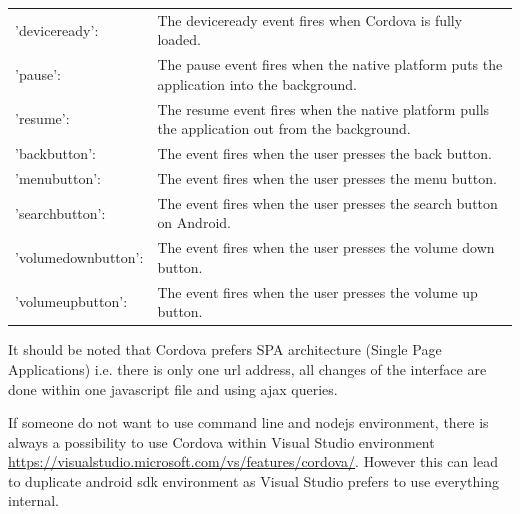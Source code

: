 \begin{tabularx}{\textwidth}{lX}
'deviceready':& The deviceready event fires when Cordova is fully loaded.\\
'pause': & The pause event fires when the native platform puts the application into the background.\\
'resume':& The resume event fires when the native platform pulls the application out from the background.\\
'backbutton':& The event fires when the user presses the back button.\\
'menubutton':& The event fires when the user presses the menu button. \\
'searchbutton':& The event fires when the user presses the search button on Android. \\
'volumedownbutton':& The event fires when the user presses the volume down button.\\
'volumeupbutton':& The event fires when the user presses the volume up button.\\
\end{tabularx}

It should be noted that Cordova prefers SPA architecture (Single Page Applications) i.e. there is only one url address, all changes of the interface are done within one javascript file and using ajax queries.

\begin{remark}
If someone do not want to use command line and nodejs environment, there is always a possibility to use Cordova within Visual Studio environment \url{https://visualstudio.microsoft.com/vs/features/cordova/}. However this can lead to duplicate android sdk environment as Visual Studio prefers to use everything internal.
\end{remark}


